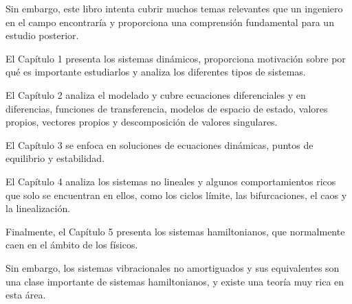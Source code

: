 \documentclass[12pt, letterpaper, twoside]{article}
\begin{document}
\hfill

Sin embargo, este libro intenta cubrir muchos temas relevantes que un ingeniero en el campo encontraría y proporciona una comprensión fundamental para un estudio posterior.

\hfill

El Capítulo 1 presenta los sistemas dinámicos, proporciona motivación sobre por qué es importante estudiarlos y analiza los diferentes tipos de sistemas.


\hfill

El Capítulo 2 analiza el modelado y cubre ecuaciones diferenciales y en diferencias, funciones de transferencia, modelos de espacio de estado, valores propios, vectores propios y descomposición de valores singulares.

\hfill

El Capítulo 3 se enfoca en soluciones de ecuaciones dinámicas, puntos de equilibrio y estabilidad.

\hfill

El Capítulo 4 analiza los sistemas no lineales y algunos comportamientos ricos que solo se encuentran en ellos, como los ciclos límite, las bifurcaciones, el caos y la linealización.

\hfill

Finalmente, el Capítulo 5 presenta los sistemas hamiltonianos, que normalmente caen en el ámbito de los físicos. 


\hfill

Sin embargo, los sistemas vibracionales no amortiguados y sus equivalentes son una clase importante de sistemas hamiltonianos, y existe una teoría muy rica en esta área.





\end{document}
